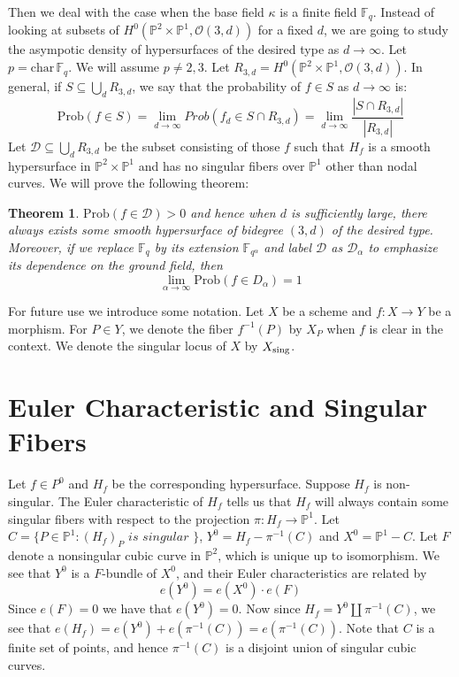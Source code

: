 \documentclass[12pt]{article}
\theoremstyle{plain}
\newtheorem{theorem}[equation]{Theorem}
\theoremstyle{definition}
\newcommand{\IF}{\mathbb{F}}
\newcommand{\IP}{\mathbb{P}}
\newcommand{\sO}{\mathcal{O}}
\newcommand{\sing}{{\rm sing}}
\newcommand\union{\bigcup}
\newcommand{\<}{\langle}
\renewcommand{\>}{\rangle}
\newcommand{\Prob}{\mathrm{Prob}}
\newcommand{\sD}{\mathcal{D}}
\begin{document}
Then we deal with the case when the base field $\kappa$ is a finite field $\IF_q$. Instead of looking at subsets of $H^0(\IP^2 \times \IP^1, \sO(3, d))$ for a fixed $d$, we are going to study the asympotic density of hypersurfaces of the desired type as $d \to \infty$. Let $p = \mathrm{char}\, \IF_q$. We will assume $p \neq 2, 3$. Let $R_{3, d} = H^0(\IP^2 \times \IP^1, \sO(3, d))$. In general, if $S \subseteq \union_d R_{3, d}$, we say that the probability of $f \in S$ as $d \to \infty$ is:
$$ \Prob(f \in S) = \lim_{d \to \infty} Prob(f_d \in S \cap R_{3, d}) = \lim_{d \to \infty} \frac{|S \cap R_{3, d}|}{|R_{3, d}|} $$
Let $\sD \subseteq \union_d R_{3, d}$ be the subset consisting of those $f$ such that $H_f$ is a smooth hypersurface in $\IP^2 \times \IP^1$ and has no singular fibers over $\IP^1$ other than nodal curves. We will prove the following theorem:
\begin{theorem}
\label{main}
$ \Prob(f \in \sD) > 0 $ and hence when $d$ is sufficiently large, there always exists some smooth hypersurface of bidegree $(3, d)$ of the desired type. Moreover, if we replace $\IF_q$ by its extension $\IF_{q^\alpha}$ and label $\sD$ as $\sD_\alpha$ to emphasize its dependence on the ground field, then $$ \lim_{\alpha \to \infty} \Prob(f \in D_\alpha) = 1$$
\end{theorem}

For future use we introduce some notation. Let $X$ be a scheme and $f : X \to Y$ be a morphism. For $P \in Y$, we denote the fiber $f^{-1}(P)$ by $X_P$ when $f$ is clear in the context. We denote the singular locus of $X$ by $X_\sing$. 

\section{Euler Characteristic and Singular Fibers}
Let $f \in P^0$ and $H_f$ be the corresponding hypersurface. Suppose $H_f$ is non-singular. The Euler characteristic of $H_f$ tells us that $H_f$ will always contain some singular fibers with respect to the projection $\pi : H_f \to \IP^1$. Let $C = \{ P \in \IP^1 : (H_f)_P \textit{ is singular }\}$, $Y^0 = H_f - \pi^{-1}(C)$ and $X^0 = \IP^1 - C$. Let $F$ denote a nonsingular cubic curve in $\IP^2$, which is unique up to isomorphism. We see that $Y^0$ is a $F$-bundle of $X^0$, and their Euler characteristics are related by 
$$ e(Y^0) = e(X^0 ) \cdot e(F) $$ 
Since $e(F) = 0$ we have that $e(Y^0) = 0$. Now since $H_f = Y^0 \coprod \pi^{-1}(C)$, we see that $e(H_f) = e(Y^0) + e(\pi^{-1}(C)) = e(\pi^{-1}(C))$. Note that $C$ is a finite set of points, and hence $\pi^{-1} (C)$ is a disjoint union of singular cubic curves. 
\end{document}
